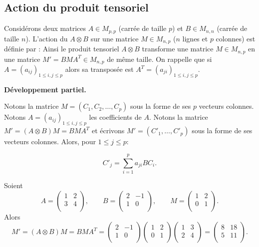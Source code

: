 \documentclass[11pt,class=report,crop=false]{standalone}
\begin{document}
\subsection{Action du produit tensoriel}

Considérons deux matrices $A \in M_{p,p}$ (carrée de taille $p$) et $B \in M_{n,n}$ (carrée de taille $n$).
L'action du  $A \otimes B$ sur une matrice $M \in M_{n,p}$ ($n$ lignes et $p$ colonnes) est définie par :
Ainsi le produit tensoriel $A \otimes B$ transforme une matrice $M \in M_{n,p}$ en une matrice $M' =B M A^T \in M_{n,p}$ de même taille.
On rappelle que si $A = (a_{ij})_{1 \le i,j \le p}$ alors sa transposée est $A^T = (a_{ji})_{1 \le i,j \le p}$.

\bigskip

\textbf{Développement partiel.}

Notons la matrice $M = (C_1, C_2, \ldots, C_p)$ sous la forme de ses $p$ vecteurs colonnes.
Notons $A = (a_{ij})_{1 \le i,j \le p}$ les coefficients de $A$.
Notons la matrice $M' = (A \otimes B) M = BMA^T$ et écrivons $M' = (C'_1, \ldots, C'_p)$ sous la forme de ses vecteurs colonnes.
Alors, pour $1 \le j \le p$: 

\begin{equation}
	\label{eq:produittensoriel}
	\tag{\dag}
	C'_j = \sum_{i=1}^p a_{ji} BC_i.
\end{equation}



\begin{exemple}
	Soient
$$A = 
\begin{pmatrix}
1 & 2 \\ 
3 & 4 \\
\end{pmatrix},
\qquad
B = 
\begin{pmatrix}
2 & -1 \\
1 & 0 \\
\end{pmatrix},
\qquad
M = 
\begin{pmatrix}
1 & 2 \\
0 & 1 \\
\end{pmatrix}.
$$
Alors 
$$
M' = (A \otimes B) M = BMA^T = 
\begin{pmatrix}
	2 & -1 \\
	1 & 0 \\
\end{pmatrix}
\begin{pmatrix}
	1 & 2 \\
	0 & 1 \\
\end{pmatrix}
\begin{pmatrix}
	1 & 3 \\ 
	2 & 4 \\
\end{pmatrix}
=
\begin{pmatrix}
	8 & 18 \\ 
	5 & 11 \\
\end{pmatrix}.
$$
\end{exemple}
\end{document}
